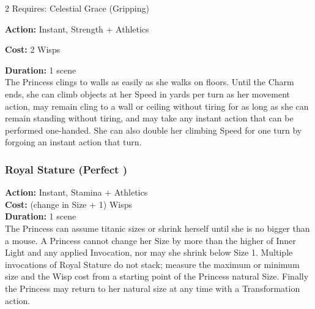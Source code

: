 \begin{multicols}{2}
\noindent Requires: Celestial Grace (Gripping)

\noindent \textbf{Action:} Instant, Strength + Athletics

\noindent \textbf{Cost:} 2 Wisps

\noindent \textbf{Duration:} 1 scene \\

\noindent The Princess clings to walls as easily as she walks on floors. Until the Charm ends, she can climb objects at her Speed in yards per turn as her movement action, may remain cling to a wall or ceiling without tiring  for as long as she can remain standing without tiring, and may take any instant action that can be performed one-handed. She can also double her climbing Speed for one turn by forgoing an instant action that turn.

\subsubsection*{Royal Stature (Perfect \textbullet\textbullet\textbullet\textbullet)}

\noindent \textbf{Action:} Instant, Stamina + Athletics\\

\noindent \textbf{Cost:} (change in Size + 1) Wisps\\

\noindent \textbf{Duration:} 1 scene \\

\noindent The Princess can assume titanic sizes or shrink herself until she is no bigger than a mouse. A Princess cannot change her Size by more than the higher of Inner Light and any applied Invocation, nor may she shrink below Size 1. Multiple invocations of Royal Stature do not stack; measure the maximum or minimum size and the Wisp cost from a starting point of the Princess natural Size. Finally the Princess may return to her natural size at any time with a Transformation action.  
\label{SizeTable}

	\bigsidebarstart

 \centering 
 

\end{multicols}
